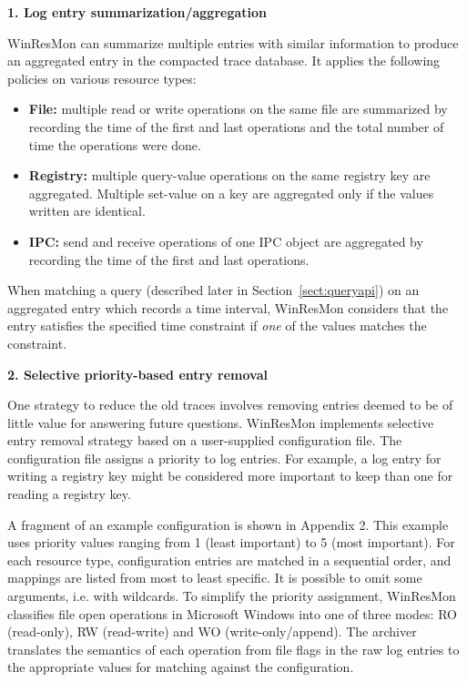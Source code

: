 \noindent
{\bf 1. Log entry summarization/aggregation}

WinResMon can summarize multiple entries with similar information to produce an
aggregated entry in the compacted trace database.  It applies the following
policies on various resource types:

\begin{itemize}

\item {\bf File:} multiple read or write operations on the same file are
summarized by recording the time of the first and last operations and the
total number of time the operations were done.

\item {\bf Registry:} multiple query-value operations on the same registry key
are aggregated.  Multiple set-value on a key are aggregated only if the values
written are identical.

\item {\bf IPC:} send and receive operations of one IPC object are aggregated
by recording the time of the first and last operations.

\end{itemize}

When matching a query (described later in Section~\ref{sect:queryapi})
on an aggregated entry which records a time interval,
WinResMon considers that the entry satisfies the specified time constraint
if {\it one} of the values matches the constraint.

\noindent
{\bf 2. Selective priority-based entry removal}

One strategy to reduce the old traces involves removing entries deemed to be
of little value for answering future questions. WinResMon implements selective
entry removal strategy based on a user-supplied configuration file.  The
configuration file assigns a priority to log entries.  For example, a log
entry for writing a registry key might be considered more important to keep
than one for reading a registry key.

A fragment of an example configuration is shown in Appendix 2.  This example
uses priority values ranging from 1 (least important) to 5 (most important).
For each resource type, configuration entries are matched in a sequential
order, and mappings are listed from most to least specific.  It is possible to
omit some arguments, i.e. with wildcards.  To simplify the priority
assignment, WinResMon classifies file open operations in Microsoft Windows 
into one of three modes: RO (read-only), RW (read-write) and WO
(write-only/append). The archiver translates the semantics of each operation
from file flags in the raw log entries to the appropriate values for matching
against the configuration.


